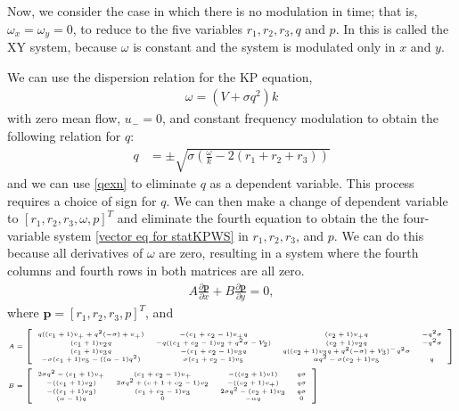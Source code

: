 \documentclass[12pt]{article}
\numberwithin{equation}{section}
\begin{document}
Now, we consider the case in which there is no modulation in time; that is, $\omega_x = \omega_y = 0$, to reduce to the five variables $r_1,r_2,r_3,q$ and $p$. In \cite{biondini2023two} this is called the XY system, because $\omega$ is constant and the system is modulated only in $x$ and $y$.

We can use the dispersion relation for the KP equation, 
\begin{align}
    \omega = (V + \sigma q^2)k
\end{align}
with zero mean flow, $u_- = 0$, and constant frequency modulation to obtain the following relation for $q$:
\begin{align}
    q & =  \pm \sqrt{\sigma\left(\frac{\omega}{k}-2(r_1+r_2+r_3)\right)} \label{qexn}
\end{align}
and we can use \eqref{qexn} to eliminate $q$ as a dependent variable. This process requires a choice of sign for $q$. We can then make a change of dependent variable to $[r_1,r_2,r_3,\omega,p]^T$ and eliminate the fourth equation to obtain the the four-variable system \eqref{vector eq for statKPWS} in $r_1,r_2,r_3$, and $p$. We can do this because all derivatives of $\omega$ are zero, resulting in a system where the fourth columns and fourth rows in both matrices are all zero. 
\begin{align}
    A\frac{\partial \textbf{p}}{\partial x} + B\frac{\partial \textbf{p}}{\partial y} =0, \label{vector eq for statKPWS}
\end{align}
where $\textbf{p} = [r_1,r_2,r_3,p]^T$, and 
\begin{subequations}
{\tiny
\begin{align}
       A &= \left[\begin{array}{cccc}
        q((c_1+1)v_++q^2(-\sigma)+v_+) & -(c_1+c_2-1)v_+q & (c_2+1)v_+q & -q^2 \sigma  \\
         (c_1 + 1)v_2q & -q((c_1+c_2-1)v_2+q^2\sigma -V_2) & (c_2+1)v_2q & -q^2\sigma \\
         (c_1+1)v_3q & -(c_1+c_2-1)v_3q & q((c_2+1)v_3q + q^2(-\sigma)+V_3) ^ -q^2\sigma \\
         -\sigma(c_1+1)v_5-((\alpha-1)q^2) & \sigma(c_1+c_2-1)v_5 & \alpha q^2 -\sigma(c_2+1)v_5 & q
    \end{array}\right] \label{a4p} \\
     B &= \left[\begin{array}{cccc}
        2\sigma q^2 -(c_1+1)v_+ & (c_1+c_2-1)v_+ & -((c_2+1)v1) & q\sigma \\
        -((c_1+1)v_2) & 2 \sigma q^2 + (c+1+c_2-1)v_2 & -((c_2+1)v_+) & q\sigma \\
        -((c_1+1)v_3) & (c_1+c_2-1)v_3 & 2\sigma q^2 -(c_2+1)v_3 & q\sigma \\
        (\alpha -1)q & 0 & -\alpha q & 0
    \end{array}\right] \label{b4p}
\end{align}
}    
\end{subequations}
\end{document}
